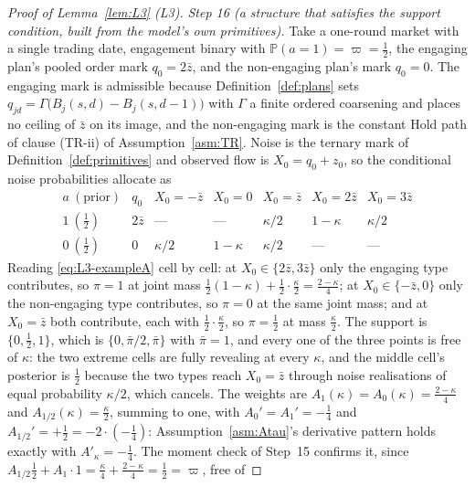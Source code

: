 \documentclass[11pt]{article}
\newcommand{\Prb}{\mathbb{P}}
\newcommand{\Akap}{A'_{\kappa}}
\begin{document}
\begin{proof}[Proof of Lemma~\ref{lem:L3} (L3)]
\emph{Step 16 (a structure that satisfies the support condition, built from the model's own
primitives).} Take a one-round market with a single trading date, engagement binary with
$\Prb(a=1) = \varpi = \tfrac12$, the engaging plan's pooled order mark $q_0 = 2\bar z$, and the
non-engaging plan's mark $q_0 = 0$. The engaging mark is admissible because
Definition~\ref{def:plans} sets $q_{jd} = \Gamma\bigl(B_j(s,d)-B_j(s,d-1)\bigr)$ with $\Gamma$ a
finite ordered coarsening and places no ceiling of $\bar z$ on its image, and the non-engaging mark
is the constant Hold path of clause (TR-ii) of Assumption~\ref{asm:TR}. Noise is the ternary mark of
Definition~\ref{def:primitives} and observed flow is $X_0 = q_0+z_0$, so the conditional noise
probabilities allocate as
\begin{equation}
\label{eq:L3-exampleA}
\begin{array}{c|c|ccccc}
a\ (\text{prior}) & q_0 & X_0 = -\bar z & X_0 = 0 & X_0 = \bar z & X_0 = 2\bar z & X_0 = 3\bar z\\
\hline
1\ (\tfrac12) & 2\bar z & \text{---} & \text{---} & \kappa/2 & 1-\kappa & \kappa/2\\
0\ (\tfrac12) & 0 & \kappa/2 & 1-\kappa & \kappa/2 & \text{---} & \text{---}
\end{array}
\end{equation}
Reading \eqref{eq:L3-exampleA} cell by cell: at $X_0 \in \{2\bar z,3\bar z\}$ only the engaging type
contributes, so $\pi = 1$ at joint mass
$\tfrac12(1-\kappa)+\tfrac12\cdot\tfrac{\kappa}{2} = \tfrac{2-\kappa}{4}$; at
$X_0 \in \{-\bar z,0\}$ only the non-engaging type contributes, so $\pi = 0$ at the same joint mass;
and at $X_0 = \bar z$ both contribute, each with $\tfrac12\cdot\tfrac{\kappa}{2}$, so
$\pi = \tfrac12$ at mass $\tfrac{\kappa}{2}$. The support is $\{0,\tfrac12,1\}$, which is
$\{0,\bar\pi/2,\bar\pi\}$ with $\bar\pi = 1$, and every one of the three points is free of $\kappa$:
the two extreme cells are fully revealing at every $\kappa$, and the middle cell's posterior is
$\tfrac12$ because the two types reach $X_0 = \bar z$ through noise realisations of equal probability
$\kappa/2$, which cancels. The weights are $A_1(\kappa) = A_0(\kappa) = \tfrac{2-\kappa}{4}$ and
$A_{1/2}(\kappa) = \tfrac{\kappa}{2}$, summing to one, with $A_0' = A_1' = -\tfrac14$ and
$A_{1/2}' = +\tfrac12 = -2\cdot(-\tfrac14)$: Assumption~\ref{asm:Atau}'s derivative pattern holds
exactly with $\Akap = -\tfrac14$. The moment check of Step~15 confirms it, since
$A_{1/2}\tfrac12+A_1\cdot 1 = \tfrac{\kappa}{4}+\tfrac{2-\kappa}{4} = \tfrac12 = \varpi$, free of

\end{proof}
\end{document}
